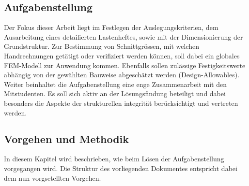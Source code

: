 \subsection{Aufgabenstellung}
Der Fokus dieser Arbeit liegt im Festlegen der Auslegungskriterien, dem Ausarbeitung eines detailierten Lastenheftes, sowie mit der Dimensionierung der Grundstruktur. Zur Bestimmung von Schnittgrössen, mit welchen Handrechnungen getätigt oder verifiziert werden können, soll dabei ein globales FEM-Modell zur Anwendung kommen. Ebenfalls sollen zulässige Festigkeitswerte abhängig von der gewählten Bauweise abgeschätzt werden (Design-Allowables).\\
Weiter beinhaltet die Aufgabenstellung eine enge Zusammenarbeit mit den Mitstudenten. Es soll sich aktiv an der Lösungsfindung beteiligt und dabei besonders die Aspekte der strukturellen integrität berücksichtigt und vertreten werden.

\subsection{Vorgehen und Methodik}
In diesem Kapitel wird beschrieben, wie beim Lösen der Aufgabenstellung vorgegangen wird. Die Struktur des vorliegenden Dokumentes entspricht dabei dem nun vorgsetellten Vorgehen.\\


